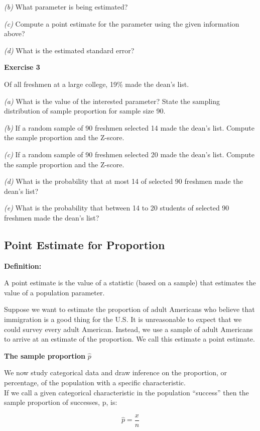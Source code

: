 \documentclass[
]{book}
\begin{document}
\emph{(b)} What parameter is being estimated?

\emph{(c)} Compute a point estimate for the parameter using the given information above?

\emph{(d)} What is the estimated standard error?

\textbf{Exercise 3}

Of all freshmen at a large college, 19\% made the dean's list.

\emph{(a)} What is the value of the interested parameter? State the sampling distribution of sample proportion for sample size 90.

\emph{(b)} If a random sample of 90 freshmen selected 14 made the dean's list. Compute the sample proportion and the Z-score.

\emph{(c)} If a random sample of 90 freshmen selected 20 made the dean's list. Compute the sample proportion and the Z-score.

\emph{(d)} What is the probability that at most 14 of selected 90 freshmen made the dean's list?

\emph{(e)} What is the probability that between 14 to 20 students of selected 90 freshmen made the dean's list?

\subsection{Point Estimate for Proportion}\label{point-estimate-for-proportion}

\textbf{Definition:}

A point estimate is the value of a statistic (based on a sample) that estimates the value of a population parameter.

Suppose we want to estimate the proportion of adult Americans who believe that immigration is a good thing for the U.S. It is unreasonable to expect that we could survey every adult American. Instead, we use a sample of adult Americans to arrive at an estimate of the proportion. We call this estimate a point estimate.

\textbf{The sample proportion} \(\hat{p}\)

We now study categorical data and draw inference on the proportion, or percentage, of the population with a specific characteristic.\\
If we call a given categorical characteristic in the population ``success'' then the sample proportion of successes, p, is:

\[\hat{p}= \frac{x}{n} \]
\end{document}
